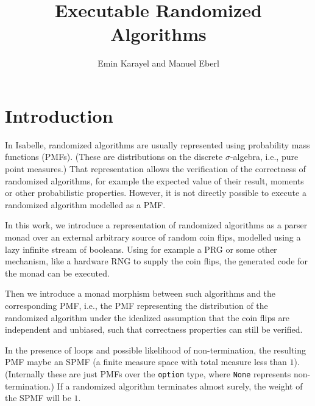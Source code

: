 \documentclass[11pt,a4paper]{article}
\begin{document}
\title{Executable Randomized Algorithms}
\author{Emin Karayel and Manuel Eberl}
\maketitle


\tableofcontents

\section{Introduction}
In Isabelle, randomized algorithms are usually represented using probability mass functions (PMFs).
(These are distributions on the discrete $\sigma$-algebra, i.e., pure point measures.) That
representation allows the verification of the correctness of randomized algorithms, for example
the expected value of their result, moments or other probabilistic properties. However, it is not
directly possible to execute a randomized algorithm modelled as a PMF.

In this work, we introduce a representation of randomized algorithms as a parser monad over an
external arbitrary source of random coin flips, modelled using a lazy infinite stream of booleans.
Using for example a PRG or some other mechanism, like a hardware RNG to supply the coin flips, the
generated code for the monad can be executed.

Then we introduce a monad morphism between such algorithms and the corresponding PMF, i.e., the PMF
representing the distribution of the randomized algorithm under the idealized assumption that the
coin flips are independent and unbiased, such that correctness properties can still be verified.

In the presence of loops and possible likelihood of non-termination, the resulting PMF maybe an
SPMF (a finite measure space with total measure less than $1$). (Internally these are just PMFs over
the \verb+option+ type, where \verb+None+ represents non-termination.) If a randomized algorithm
terminates almost surely, the weight of the SPMF will be $1$.
\end{document}

